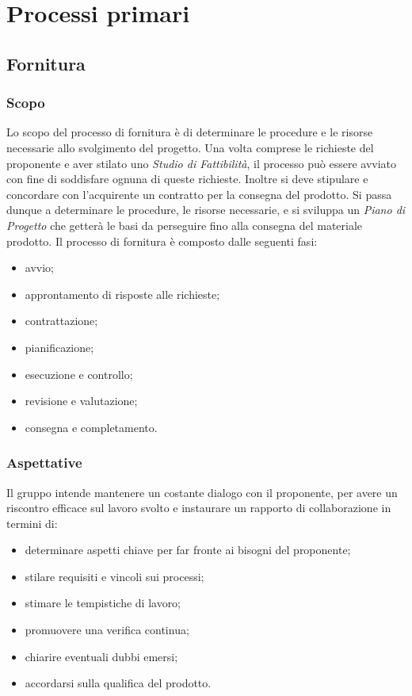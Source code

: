 \section{Processi primari}
\subsection{Fornitura}
\subsubsection{Scopo}
Lo scopo del processo di fornitura è di determinare le procedure e le risorse necessarie allo svolgimento del progetto. Una volta comprese le richieste del proponente e aver stilato uno \textit{Studio di Fattibilità}, il processo può essere avviato con fine di soddisfare ognuna di queste richieste. Inoltre si deve stipulare e concordare con l'acquirente un contratto per la consegna del prodotto. Si passa dunque a determinare le procedure, le risorse necessarie, e si sviluppa un \textit{Piano di Progetto} che getterà le basi da perseguire fino alla consegna del materiale prodotto.
	Il processo di fornitura è composto dalle seguenti fasi:
	\begin{itemize}
		\item avvio;
		\item approntamento di risposte alle richieste;
		\item contrattazione;
		\item pianificazione;
		\item esecuzione e controllo;
		\item revisione e valutazione;
		\item consegna e completamento.
	\end{itemize}
	\subsubsection{Aspettative}
	Il gruppo intende mantenere un costante dialogo con il proponente, per avere un riscontro efficace sul lavoro svolto e instaurare un rapporto di collaborazione in termini di:
	\begin{itemize}
		\item determinare aspetti chiave per far fronte ai bisogni del proponente;
		\item stilare requisiti e vincoli sui processi;
		\item stimare le tempistiche di lavoro;
		\item promuovere una verifica continua;
		\item chiarire eventuali dubbi emersi;
		\item accordarsi sulla qualifica del prodotto.
	\end{itemize}
